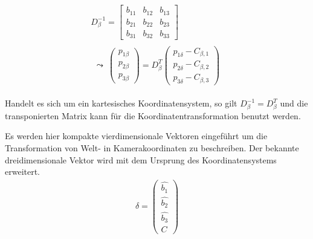\begin{gather}
	D_\beta^{-1} = 
	\begin{bmatrix}b_{11} & b_{12} & b_{13}\\
		b_{21} & b_{22} & b_{23}\\
		b_{31} & b_{32} & b_{33}
	\end{bmatrix} \\
	\begin{split}
		\leadsto \: \begin{pmatrix}
			p_{1\beta}\\p_{2\beta}\\ p_{3\beta}
		\end{pmatrix}
		= D_\beta^T 
		\begin{pmatrix}
			p_{1\delta} - C_{\beta,1}\\
			p_{2\delta} - C_{\beta,2}\\
			p_{3\delta} - C_{\beta,3}
		\end{pmatrix}
	\end{split} 
\end{gather}

Handelt es sich um ein kartesisches Koordinatensystem, so gilt $\ensuremath{D_\beta^{-1}}=D_\beta^{T}$ und die transponierten Matrix kann für die Koordinatentransformation benutzt werden. 


Es werden hier  kompakte vierdimensionale Vektoren eingeführt um die  Transformation von Welt- in Kamerakoordinaten  zu beschreiben. Der bekannte dreidimensionale Vektor wird mit dem Ursprung des Koordinatensystems erweitert. 
\begin{gather}
	\delta=
	\begin{pmatrix}
		\hat{b_1}\\
		\hat{b_2}\\
		\hat{b_3}\\
		C
	\end{pmatrix}
\end{gather}


